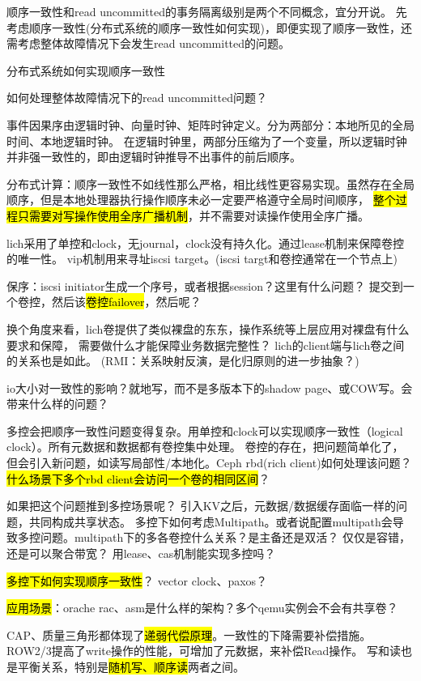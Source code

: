顺序一致性和read uncommitted的事务隔离级别是两个不同概念，宜分开说。
先考虑顺序一致性(分布式系统的顺序一致性如何实现)，即便实现了顺序一致性，还需考虑整体故障情况下会发生read uncommitted的问题。
\begin{enumbox}
\item 分布式系统如何实现顺序一致性
\item 如何处理整体故障情况下的read uncommitted问题？
\end{enumbox}

事件因果序由逻辑时钟、向量时钟、矩阵时钟定义。分为两部分：本地所见的全局时间、本地逻辑时钟。
在逻辑时钟里，两部分压缩为了一个变量，所以逻辑时钟并非强一致性的，即由逻辑时钟推导不出事件的前后顺序。

分布式计算：顺序一致性不如线性那么严格，相比线性更容易实现。虽然存在全局顺序，但是本地处理器执行操作顺序未必一定要严格遵守全局时间顺序，
\hl{整个过程只需要对写操作使用全序广播机制}，并不需要对读操作使用全序广播。

lich采用了单控和clock，无journal，clock没有持久化。通过lease机制来保障卷控的唯一性。
vip机制用来寻址iscsi target。(iscsi targt和卷控通常在一个节点上)

保序：iscsi initiator生成一个序号，或者根据session？这里有什么问题？
提交到一个卷控，然后该\hl{卷控failover}，然后呢？

换个角度来看，lich卷提供了类似裸盘的东东，操作系统等上层应用对裸盘有什么要求和保障，
需要做什么才能保障业务数据完整性？ lich的client端与lich卷之间的关系也是如此。
(RMI：关系映射反演，是化归原则的进一步抽象？)

io大小对一致性的影响？就地写，而不是多版本下的shadow page、或COW写。会带来什么样的问题？

多控会把顺序一致性问题变得复杂。用单控和clock可以实现顺序一致性（logical clock）。所有元数据和数据都有卷控集中处理。
卷控的存在，把问题简单化了，但会引入新问题，如读写局部性/本地化。Ceph rbd(rich client)如何处理该问题？
\hl{什么场景下多个rbd client会访问一个卷的相同区间}？

如果把这个问题推到多控场景呢？ 引入KV之后，元数据/数据缓存面临一样的问题，共同构成共享状态。
多控下如何考虑Multipath。或者说配置multipath会导致多控问题。multipath下的多各卷控什么关系？是主备还是双活？
仅仅是容错，还是可以聚合带宽？ 用lease、cas机制能实现多控吗？

\hl{多控下如何实现顺序一致性}？ vector clock、paxos？

\hl{应用场景}：orache rac、asm是什么样的架构？多个qemu实例会不会有共享卷？

CAP、质量三角形都体现了\hl{递弱代偿原理}。一致性的下降需要补偿措施。
ROW2/3提高了write操作的性能，可增加了元数据，来补偿Read操作。
写和读也是平衡关系，特别是\hl{随机写、顺序读}两者之间。

